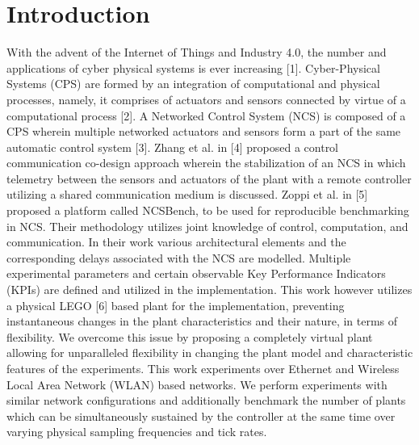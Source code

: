\section{Introduction}\label{sec:intro}




With the advent of the Internet of Things and Industry 4.0, the number and applications of cyber physical systems is ever increasing [1].
Cyber-Physical Systems (CPS) are formed by an integration of computational and physical processes, namely, it comprises of actuators and sensors connected by virtue of a computational process [2]. A Networked Control System (NCS) is composed of a CPS wherein multiple networked actuators and sensors form a part of the same automatic control system [3].
Zhang et al. in [4] proposed a control communication co-design approach wherein the stabilization of an NCS in which telemetry between the sensors and actuators of the plant with a remote controller utilizing a shared communication medium is discussed.
Zoppi et al. in [5] proposed a platform called NCSBench, to be used for reproducible benchmarking in NCS.
Their methodology utilizes joint knowledge of control, computation, and communication.
In their work various architectural elements and the corresponding delays associated with the NCS are modelled.
Multiple experimental parameters and certain observable Key Performance Indicators (KPIs) are defined and utilized in the implementation.
This work however utilizes a physical LEGO [6] based plant for the implementation, preventing instantaneous changes in the plant characteristics and their nature, in terms of flexibility.
We overcome this issue by proposing a completely virtual plant allowing for unparalleled flexibility in changing the plant model and characteristic features of the experiments.
This work experiments over Ethernet and Wireless Local Area Network (WLAN) based networks.
We perform experiments with similar network configurations and additionally benchmark the number of plants which can be simultaneously sustained by the controller at the same time over varying physical sampling frequencies and tick rates.

